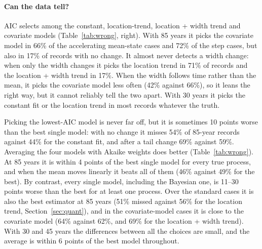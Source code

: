\documentclass[11pt]{article}
\begin{document}
\paragraph{Can the data tell?}
AIC selects among the constant, location-trend, location + width trend and covariate models
(Table~\ref{tab:wrong}, right). With 85 years it picks the covariate model in 66\% of the
accelerating mean-state cases and 72\% of the step cases, but also in 17\% of records with no change.
It almost never detects a width change: when only the width changes it picks the location trend in
71\% of records and the location + width trend in 17\%. When the width follows time rather than the
mean, it picks the covariate model less often (42\% against 66\%), so it leans the right way, but it
cannot reliably tell the two apart. With 30 years it picks the constant fit or the location trend in
most records whatever the truth.

Picking the lowest-AIC model is never far off, but it is sometimes 10 points worse than the best
single model: with no change it misses 54\% of 85-year records against 44\% for the constant fit,
and after a tail change 69\% against 59\%. Averaging the four models with Akaike weights does better
(Table~\ref{tab:wrong}). At 85 years it is within 4 points of the best single model for every true
process, and when the mean moves linearly it beats all of them (46\% against 49\% for the best). By
contrast, every single model, including the Bayesian one, is 11--30 points worse than the best for
at least one process. Over the standard cases it is also the best estimator at 85 years (51\%
missed against 56\% for the location trend, Section~\ref{sec:quant}), and in the covariate-model
cases it is close to the covariate model (64\% against 62\%, and 69\% for the location + width
trend). With 30 and 45 years the differences between all the choices are small,
and the average is within 6 points of the best model throughout.
\end{document}
